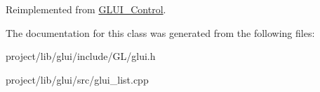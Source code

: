 Reimplemented from \hyperlink{classGLUI__Control}{G\-L\-U\-I\-\_\-\-Control}.



The documentation for this class was generated from the following files\-:\begin{DoxyCompactItemize}
\item 
project/lib/glui/include/\-G\-L/glui.\-h\item 
project/lib/glui/src/glui\-\_\-list.\-cpp\end{DoxyCompactItemize}
